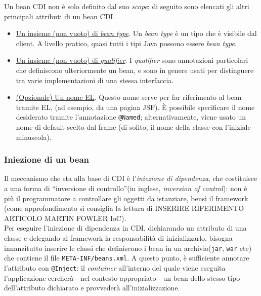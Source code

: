 Un bean CDI non è solo definito dal suo \textit{scope}: di seguito sono elencati gli altri principali attributi di un bean CDI.
\begin{itemize}
\item \underline{Un insieme (non vuoto) di \textit{bean type}}. Un \textit{bean type} è un tipo che è visibile dal client. A livello pratico, quasi tutti i tipi Java possono essere \textit{bean type}.
\item \underline{Un insieme (non vuoto) di \textit{qualifier}}. I \textit{qualifier} sono annotazioni particolari che definiscono ulteriormente un bean, e sono in genere usati per distinguere tra varie implementazioni di una stessa interfaccia.
\item \underline{(Opzionale) Un nome EL}. Questo nome serve per far riferimento al bean tramite EL, (ad esempio, da una pagina JSF). È possibile specificare il nome desiderato tramite l'annotazione \lstinline{@Named}; alternativamente, viene usato un nome di default scelto dal frame (di solito, il nome della classe con l'iniziale minuscola).
\end{itemize}

\subsubsection{Iniezione di un bean}
Il meccanismo che sta alla base di CDI è l'\textsl{iniezione di dipendenza}, che costituisce a una forma di \textquotedblleft inversione di controllo\textquotedblright (in inglese, \textit{inversion of control}): non è più il programmatore a controllare gli oggetti da istanziare, bensì il framework (come approfondimento si consiglia la lettura di INSERIRE RIFERIMENTO ARTICOLO MARTIN FOWLER IoC).\\
Per eseguire l'iniezione di dipendenza in CDI, dichiarando un attributo di una classe e delegando al framework la responsabilità di inizializzarlo, bisogna innanzitutto inserire le classi che definiscono i bean in un archivio(\texttt{jar}, \texttt{war} etc) che contiene il file \texttt{META-INF/beans.xml}. A questo punto, è sufficiente annotare l'attributo con \lstinline{@Inject}: il \textit{container} all'interno del quale viene eseguita l'applicazione cercherà - nel contesto appropriato - un bean dello stesso tipo dell'attributo dichiarato e provvederà all'inizializzazione.\\

